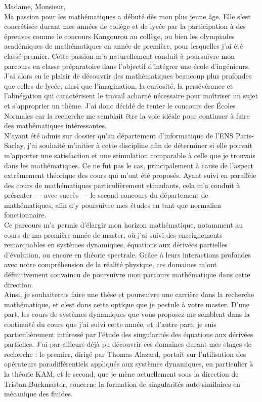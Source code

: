 \documentclass[12pt,a4paper]{article}
\begin{document}
Madame, Monsieur, \\

Ma passion pour les mathématiques a débuté dès mon plus jeune âge. Elle s’est concrétisée durant mes années de collège et de lycée par la participation à des épreuves comme le concours Kangourou au collège, ou bien les olympiades académiques de mathématiques en année de première, pour lesquelles j’ai été classé premier.  Cette passion m’a naturellement conduit à poursuivre mon parcours en classe préparatoire dans l’objectif d’intégrer une école d’ingénieurs.  \\

J'ai alors eu le plaisir de découvrir des mathématiques beaucoup plus profondes que celles de lycée, ainsi que l’imagination, la curiosité, la persévérance et l’abnégation qui caractérisent le travail acharné nécessaire pour maîtriser un sujet et s'approprier un thème. J'ai donc décidé de tenter le concours des Écoles Normales car la recherche me semblait être la voie idéale pour continuer à faire des mathématiques intéressantes. \\

N’ayant été admis sur dossier qu’au département d’informatique de l’ENS Paris-Saclay, j’ai souhaité m'initier à cette discipline afin de déterminer si elle pouvait m’apporter une satisfaction et une stimulation comparable à celle que je trouvais dans les mathématiques. Ce ne fut pas le cas, principalement à cause de l'aspect extrêmement théorique des cours qui m'ont été proposés. Ayant suivi en parallèle des cours de mathématiques particulièrement stimulants, cela m’a conduit à présenter — avec succès — le second concours du département de mathématiques, afin d’y poursuivre mes études en tant que normalien fonctionnaire.\\

Ce parcours m’a permis d’élargir mon horizon mathématique, notamment au cours de ma première année de master, où j’ai suivi des enseignements remarquables en systèmes dynamiques, équations aux dérivées partielles d’évolution, ou encore en théorie spectrale. Grâce à leurs interactions profondes avec notre compréhension de la réalité physique, ces domaines m’ont définitivement convaincu de poursuivre mon parcours mathématique dans cette direction.\\

Ainsi, je souhaiterais faire une thèse et poursuivre une carrière dans la recherche mathématique, et c'est dans cette optique que je postule à votre master. D'une part, les cours de systèmes dynamiques que vous proposez me semblent dans la continuité du cours que j'ai suivi cette année, et d'autre part, je suis particulièrement intéressé par l'étude des singularités des équations aux dérivées partielles. J'ai par ailleurs déjà pu découvrir ces domaines durant mes stages de recherche : le premier, dirigé par Thomas Alazard, portait sur l'utilisation des opérateurs paradifférentiels appliqués aux systèmes dynamiques, en particulier à la théorie KAM, et le second, que je mène actuellement sous la direction de Tristan Buckmaster, concerne la formation de singularités auto-similaires en mécanique des fluides. \\
\end{document}
